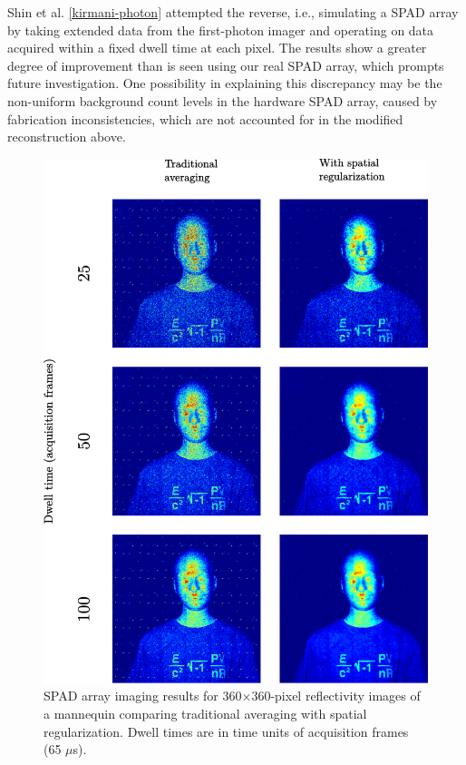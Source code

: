 Shin et al. \ref{kirmani-photon} attempted the reverse, i.e., simulating a SPAD array by taking extended data from the first-photon imager and operating on data acquired within a fixed dwell time at each pixel. The results show a greater degree of improvement than is seen using our real SPAD array, which prompts future investigation. One possibility in explaining this discrepancy may be the non-uniform background count levels in the hardware SPAD array, caused by fabrication inconsistencies, which are not accounted for in the modified reconstruction above.

\begin{figure}[h!]
\centerline{\includegraphics[width=15cm]{figure-first-spad-pvnrt-i.pdf}}
\caption{SPAD array imaging results for 360$\times$360-pixel reflectivity images of a mannequin comparing traditional averaging with spatial regularization. Dwell times are in time units of acquisition frames (65 $\mu$s).}
\label{figure:first-spad-pvnrt-i}
\end{figure}

